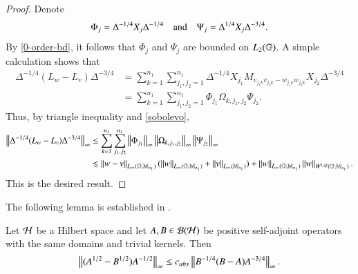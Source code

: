 \documentclass[leqno]{amsart}
\begin{document}
\begin{proof}
		
		Denote
		\begin{align*}
			\Phi_{j}=\Delta^{-1/4}X_{j}\Delta^{-1/4}\quad{\rm and}\quad\Psi_{j}=\Delta^{1/4}X_{j}\Delta^{-3/4}.
		\end{align*}
		By \eqref{0-order-bd}, it follows that $\Phi_{j}$ and $\Psi_{j}$ are bounded on $L_{2}(\mathbb{G})$.
		A simple calculation shows that
		\begin{align*}
			\Delta^{-1/4}(L_{w}-L_{v})\Delta^{-3/4}
			&=\sum_{k=1}^{n_{1}}\sum_{j_{1},j_{2}=1}^{n_{1}}
			\Delta^{-1/4}X_{j_{1}}M_{v_{j_{1}k}v_{j_{2}k}-w_{j_{1}k}w_{j_{2}k}}X_{j_{2}}\Delta^{-3/4}\\
			&=\sum_{k=1}^{n_{1}}\sum_{j_{1},j_{2}=1}^{n_{1}}\Phi_{j_{1}}\Omega_{k,j_{1},j_{2}}\Psi_{j_{2}}.
		\end{align*}
		Thus, by triangle inequality and \eqref{sobolevo},
		\begin{align*}
			\left\| \Delta^{-1/4}(L_{w}-L_{v})\Delta^{-3/4} \right\|_{\infty}
			&\leq\sum_{k=1}^{n_{1}}\sum_{j_{1},j_{2}}^{n_{1}}\left\| \Phi_{j_{1}} \right\|_{\infty}
			\left\| \Omega_{k,j_{1},j_{2}} \right\|_{\infty}\left\| \Psi_{j_{2}} \right\|_{\infty}\\
			&\lesssim \left\| w-v \right\|_{L_{\infty}(\mathbb{G};\mathbb{M}_{n_{1}})}(\left\| w \right\|_{L_{\infty}(\mathbb{G};\mathbb{M}_{n_{1}})}+\left\| v \right\|_{L_{\infty}(\mathbb{M}_{n_{1}})})
			+\left\| w \right\|_{L_{\infty}(\mathbb{G};\mathbb{M}_{n_{1}})}\left\| w \right\|_{\dot{W}^{1,Q}(\mathbb{G};\mathbb{M}_{n_{1}})}.
		\end{align*}
		This is the desired result.
	\end{proof}
	
	
	
	
	The following lemma is established in \cite[Thm 3.5.1]{DAO4}.
	
	\begin{lemma}\label{farc43}
		Let ${\mathcal H}$ be a Hilbert space and let $A,B\in{\mathcal B}({\mathcal H})$ be positive self-adjoint operators with the same domains and trivial kernels. Then
		\begin{align*}
			\left\| (A^{1/2}-B^{1/2})A^{-1/2} \right\|_{\infty}
			\leq c_{abs}\left\| B^{-1/4}(B-A)A^{-3/4} \right\|_{\infty}.
		\end{align*}
	\end{lemma}
	
	
	
\end{document}
